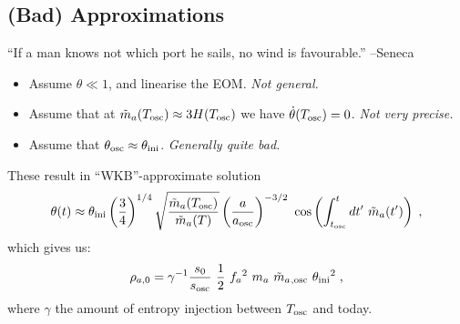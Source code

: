 \documentclass[10pt,utf8,compress,xcolor=dvipsnames]{beamer}
\begin{document}
\subsection{(Bad) Approximations}
\begin{frame}{\insertsubsectionhead}


	\begin{center}
		``If a man knows not which port he sails, no wind is favourable.''
		\flushright --Seneca %
	\end{center}


%		
	\begin{itemize}
		\item Assume $\theta \ll 1$, and linearise the EOM. {\sl Not general.}
		\item Assume that at $\tilde m_{a}{}(T_{\rm osc}{}) \approx 3H(T_{\rm osc}{})$ we have $\dot\theta(T_{\rm osc}{})=0$. {\sl Not very precise.}
		\item Assume that $\theta_{\rm osc}{} \approx \theta_{\rm ini}{}$. {\sl Generally quite bad.}\pause
	\end{itemize}
	
	These result in ``WKB''-approximate solution
	\begin{equation*}\vspace*{-0.2cm}
		\theta(t) \approx \thetai \lrb{\dfrac{3}{4}}^{1/4} \sqrt{ \dfrac{ \maT(\Tosc) }{\maT(T)} } \lrb{\dfrac{a}{\aosc}}^{-3/2} \  \cos\lrb{ \int_{\tosc}^t d t^\prime  \ \maT(t^\prime)}   \;,
	\end{equation*}
	which gives us:
	\begin{equation*}\vspace*{-0.2cm}		
		\rho_{a,0} = \gamma^{-1}  \dfrac{s_0}{s_{\rm osc}} \  \dfrac{1 }{2}  \ \fa^2 \ \ma \ \maT_{,{\rm osc}} \ \thetai^2    \;,
	\end{equation*}
	where $\gamma$ the amount of entropy injection between $T_{\rm osc}{}$ and today.%
\end{frame}
\end{document}
